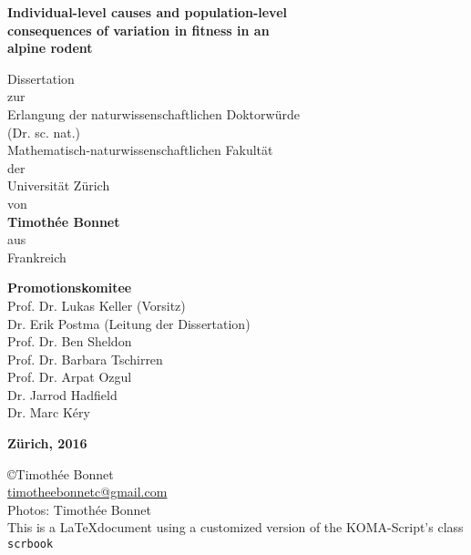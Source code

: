 \begin{titlepage}
	\thispagestyle{empty}
    \begin{center}
				 {\onehalfspacing \LARGE\selectfont\upshape\bfseries{Individual-level causes and population-level\\consequences of variation in fitness in an\\alpine rodent\\}}
				
				\vspace{1cm}
				
				\noindent\makebox[\linewidth]{\rule{0.8\paperwidth}{1pt}}
        
        \vspace{1cm}
				{\fontsize{22}{32pt}
				\doublespacing
        Dissertation
				\\
				zur
				\\
				Erlangung der naturwissenschaftlichen Doktorw\"urde
				\\
        (Dr. sc. nat.)
				\\
				Mathematisch-naturwissenschaftlichen Fakult\"at
				\\
				der
				\\
				Universit\"at Z\"urich
				\\
				von
				\\
        \vspace{1cm}
        \textbf{Timoth\'ee Bonnet}
        \\
				aus
				\\
				Frankreich
				
				\vspace{1cm}
				\textbf{Promotionskomitee}
				\\
				Prof. Dr. Lukas Keller (Vorsitz)
				\\
				Dr. Erik Postma (Leitung der Dissertation)
				\\
				Prof. Dr. Ben Sheldon
				\\
				Prof. Dr. Barbara Tschirren
				\\
				Prof. Dr. Arpat Ozgul
				\\
				Dr. Jarrod Hadfield
				\\
				Dr. Marc K\'ery
				\\
				}
        \vfill
        
        \textbf{Z\"urich, 2016}
    \end{center}
	
\end{titlepage}

	\clearpage
\begin{titlepage}
	\thispagestyle{empty}

\null\vfill
\noindent \copyright  Timoth\'ee Bonnet\\
\href{mailto:timotheebonnetc@gmail.com}{timotheebonnetc@gmail.com}\\
Photos: Timoth\'ee Bonnet\\
This is a \LaTeX document using a customized version of the KOMA-Script's class \texttt{scrbook}
\end{titlepage}